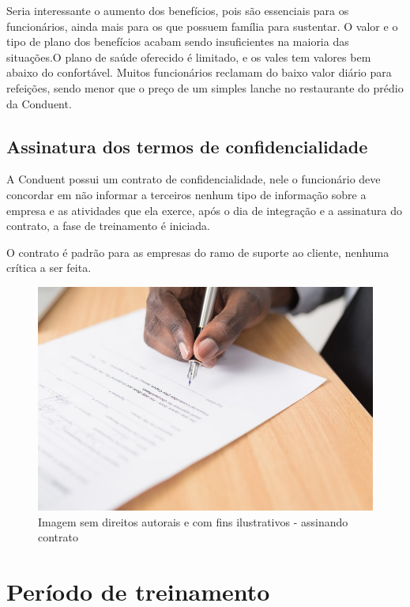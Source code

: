 \documentclass[12pt]{article}
\begin{document}
Seria interessante o aumento dos benefícios, pois são essenciais para os funcionários, ainda mais para os que possuem família para sustentar. O valor e o tipo de plano dos benefícios acabam sendo insuficientes na maioria das situações.O plano de saúde oferecido é limitado, e os vales tem valores bem abaixo do confortável. Muitos funcionários reclamam do baixo valor diário para refeições, sendo menor que o preço de um simples lanche no restaurante do prédio da Conduent.

\newpage
\subsection{Assinatura dos termos de confidencialidade}

A Conduent possui um contrato de confidencialidade, nele o funcionário deve concordar em não informar a terceiros nenhum tipo de informação sobre a empresa e as atividades que ela exerce, após o dia de integração e a assinatura do contrato, a fase de treinamento é iniciada.

O contrato é padrão para as empresas do ramo de suporte ao cliente, nenhuma crítica a ser feita.

\begin{figure}[h]
	\centering
	\includegraphics[scale=0.4]{build/images/contrato.jpg}
	\caption{Imagem sem direitos autorais e com fins ilustrativos - assinando contrato}
\end{figure}

\newpage

\section{Período de treinamento}
\end{document}
